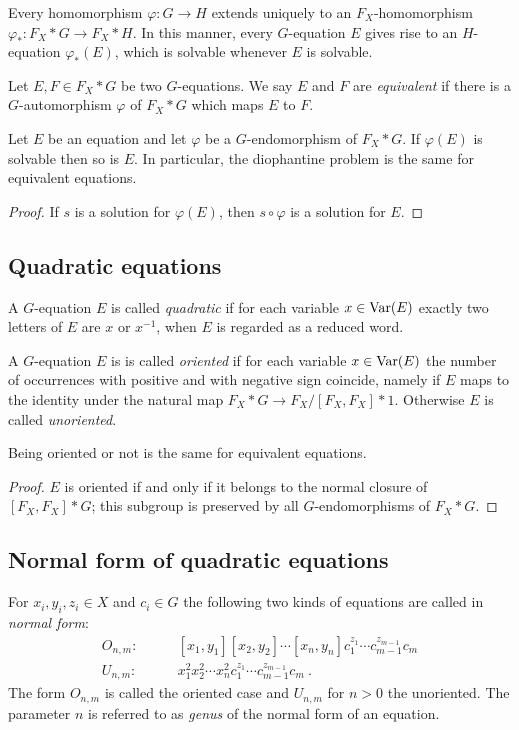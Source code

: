 \documentclass[a4paper,11pt]{amsart}
\begin{document}
Every homomorphism $\varphi \colon G \to H$ extends uniquely to an
$F_X$-ho\-mo\-morphism $\varphi_* \colon F_X*G \to F_X*H$. In this manner,
every $G$-equation $E$ gives rise to an $H$-equation $\varphi_*(E)$,
which is solvable whenever $E$ is solvable.

\begin{defi}
  Let $E,F\in F_X* G$ be two $G$-equations. We say $E$ and $F$ are
  \emph{equivalent} if there is a $G$-automorphism $\varphi$ of
  $F_X*G$ which maps $E$ to $F$.
\end{defi}
\begin{lem}
  Let $E$ be an equation and let $\varphi$ be a $G$-endomorphism of
  $F_X*G$. If $\varphi(E)$ is solvable then so is $E$. In particular,
  the diophantine problem is the same for equivalent equations.
\end{lem}
\begin{proof}
  If $s$ is a solution for $\varphi(E)$, then $s\circ\varphi$ is a
  solution for $E$.
\end{proof}

\subsection{Quadratic equations}
A $G$-equation $E$ is called \emph{quadratic} if for each variable
$x\in \textup{Var}(E)$ exactly two letters of $E$ are $x$ or $x^{-1}$, when
$E$ is regarded as a reduced word.

A $G$-equation $E$ is is called \emph{oriented} if for each variable
$x\in \textup{Var}(E)$ the number of occurrences with positive and with
negative sign coincide, namely if $E$ maps to the identity under the
natural map $F_X*G\to F_X/[F_X,F_X]*1$.  Otherwise $E$ is called
\emph{unoriented}.
\begin{lem}
 Being oriented or not is the same for equivalent equations.
\end{lem}
\begin{proof}
  $E$ is oriented if and only if it belongs to the normal closure of
  $[F_X,F_X]*G$; this subgroup is preserved by all $G$-endomorphisms
  of $F_X*G$.
\end{proof}

\subsection{Normal form of quadratic equations} \label{sec:normal_form}
\begin{defi}
  For $x_i,y_i,z_i \in X$ and $c_i \in G$ the following two kinds of
  equations are called in \emph{normal form}:
 \begin{align}
  O_{n,m}:\qquad & [x_1,y_1][x_2,y_2]\cdots[x_n,y_n]c_1^{z_1}\cdots c_{m-1}^{z_{m-1}}c_m  \\
   U_{n,m}:\qquad & x_1^2x_2^2\cdots x_n^2 c_1^{z_1}\cdots c_{m-1}^{z_{m-1}}c_m\ .
 \end{align} 
 The form $O_{n,m}$ is called the oriented case and $U_{n,m}$ for
 $n>0$ the unoriented.  The parameter $n$ is referred to as
 \emph{genus} of the normal form of an equation.
\end{defi}
\end{document}
